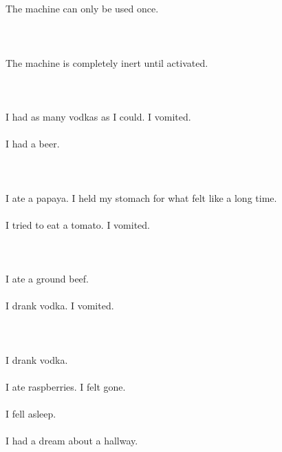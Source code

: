 \documentclass{article}
\begin{document}
    \section{}
    The machine can only be used once.\\\\ 
    \newpage
    
    \section{}
    The machine is completely inert until activated.\\\\ 
    \newpage
    
    \section{}
    I had as many vodkas as I could. I vomited.\\\\I had a beer.\\\\ 
    \newpage
    
    \section{}
    I ate a papaya. I held my stomach for what felt like a long time.\\\\I tried to eat a tomato. I vomited.\\\\ 
    \newpage
    
    \section{}
    I ate a ground beef.\\\\I drank vodka. I vomited.\\\\ 
    \newpage
    
    \section{}
    I drank vodka.\\\\I ate raspberries. I felt gone.\\\\I fell asleep.\\\\I had a dream about a hallway.\\\\ 
    \newpage
    
\end{document}
